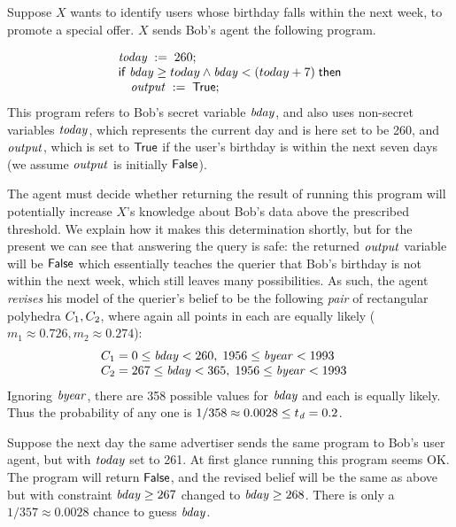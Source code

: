  Suppose $X$
wants to identify users whose birthday falls within the next week, to
promote a special offer.  $X$ sends Bob's agent the following program.
\begin{example} 
\label{ex:bday}
\begin{displaymath}
\begin{array}{l}
{\ensuremath{\mathit{today}}}\;:=\;{260}; \\
\mathsf{if}\; {\mathit{bday} \geq today \wedge \mathit{bday} < (today+7)}\;\mathsf{then} \\
\quad {\ensuremath{\mathit{output}}}\;:=\;{\mathsf{True}};\\
\end{array}
\end{displaymath}
This program refers to Bob's secret variable $\mathit{bday}$, and also
uses non-secret variables $\mathit{today}$, which represents the current
day and is here set to be 260, and $\mathit{output}$, which is set to
$\mathsf{True}$ if the user's birthday is within the next seven days (we
assume $\mathit{output}$ is initially $\mathsf{False}$).
\end{example}

The agent must decide whether returning the result of
running this program will potentially increase $X$'s knowledge
about Bob's data above the prescribed threshold.  We explain how it
makes this determination shortly, but for the present we can see that
answering the query is safe: the returned $\mathit{output}$ variable will
be $\mathsf{False}$ which essentially teaches the querier that Bob's birthday
is not within the next week, which still leaves many possibilities.  As
such, the agent \emph{revises} his model of the querier's belief to be
the following \emph{pair} of rectangular polyhedra $C_{1},
C_{2}$, where again all points in each are equally likely
($m_1 \approx 0.726, m_2 \approx 0.274$):
$$
\begin{array}{l}
C_{1} = 0 \leq \mathit{bday} < 260,\; 1956 \leq \mathit{byear} < 1993 \quad \\
C_{2} = 267 \leq \mathit{bday} < 365,\; 1956 \leq \mathit{byear} <  1993 \quad \\
\end{array}
$$
Ignoring $\mathit{byear}$, there are 358 possible values for
$\mathit{bday}$ and each is equally likely. Thus the probability of any one is
$1 / 358 \approx 0.0028 \leq t_{\mathit{d}} = 0.2$.

\ifacita

Suppose the next day the same advertiser sends the same program to
Bob's user agent, but with $\mathit{today}$ set to 261.  At first glance
running this program seems OK.  The program will return $\mathsf{False}$, and
the revised belief will be the same as above but with constraint
$\mathit{bday} \geq 267$ changed to $\mathit{bday} \geq 268$. There
is only a $1 / 357 \approx 0.0028$ chance to guess $\mathit{bday}$.

